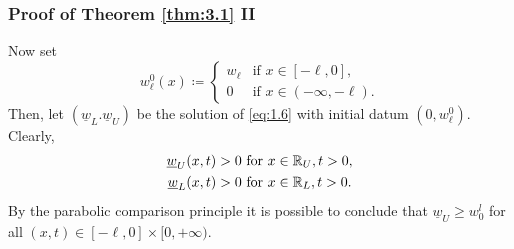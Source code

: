 
\begin{frame}
    \frametitle{Proof of Theorem \ref{thm:3.1} II}
    \begin{proofc}
        Now set 
    \begin{equation*}
        w_\ell^0(x) \coloneqq \begin{cases}
            w_\ell & \text{if } x \in [-\ell, 0], \\
            0 & \text{if } x \in (-\infty, -\ell).
        \end{cases}
    \end{equation*}
    Then, let \((\underline{w}_L. \underline{w}_U)\) be the solution of \eqref{eq:1.6} with initial datum \((0, w_\ell^0)\). Clearly,
    \begin{align*}
        \underline{w}_U(x, t) > 0 & \text{ for } x \in \mathbb{R}_U, t > 0, \\
        \underline{w}_L(x, t) > 0 & \text{ for } x \in \mathbb{R}_L, t > 0.
    \end{align*}
    By the parabolic comparison principle it is possible to conclude that \(\underline{w}_U \geq w_0^l\) for all \((x,t) \in [-\ell, 0] \times [0, +\infty)\).
    \end{proofc}
\end{frame}

